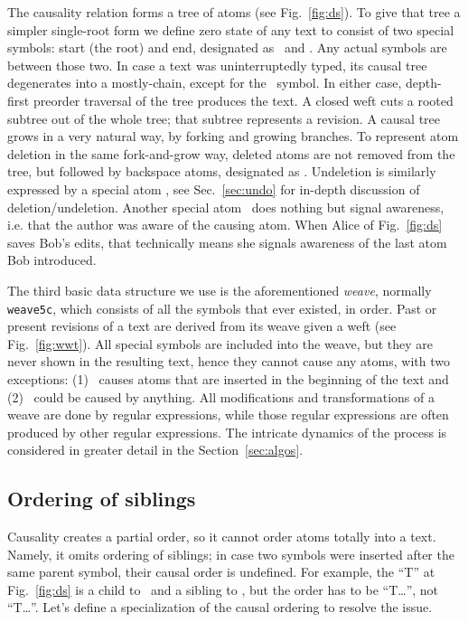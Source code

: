 \documentclass{sig-alternate}
\begin{document}
The causality relation forms a tree of atoms (see Fig.~\ref{fig:ds}).
To give that tree a simpler single-root form we define zero state of any text to consist of two special symbols: start (the root) and end, designated as \aum ~and \eoa.
Any actual symbols are between those two.
In case a text was uninterruptedly typed, its causal tree degenerates into a mostly-chain, except for the \eoa ~symbol.
In either case, depth-first preorder traversal of the tree produces the text.
A closed weft cuts a rooted subtree out of the whole tree; that subtree represents a revision.
A causal tree grows in a very natural way, by forking and growing branches.
To represent atom deletion in the same fork-and-grow way, deleted atoms are not removed from the tree, but followed by backspace atoms, designated as \bsp. 
Undeletion is similarly expressed by a special atom \cnc, see Sec.~\ref{sec:undo} for in-depth discussion of deletion/undeletion.
Another special atom \zero ~does nothing but signal awareness, i.e. that the author was aware of the causing atom. When Alice of Fig.~\ref{fig:ds} saves Bob's edits, that technically means she signals awareness of the last atom Bob introduced.

The third basic data structure we use is the aforementioned \emph{weave}, normally {\tt weave5c}, which consists of all the symbols that ever existed, in order. 
Past or present revisions of a text are derived from its weave given a weft (see Fig.~\ref{fig:wwt}).
All special symbols are included into the weave, but they are never shown in the resulting text, hence they cannot cause any atoms, with two exceptions: (1) \aum ~causes atoms that are inserted in the beginning of the text and (2) \zero ~could be caused by anything.
All modifications and transformations of a weave are done by regular expressions, while those regular expressions are often produced by other regular expressions.
The intricate dynamics of the process is considered in greater detail in the Section~\ref{sec:algos}.


\subsection {Ordering of siblings}  \label{sec:siblord}

Causality creates a partial order, so it cannot order atoms totally into a text.
Namely, it omits ordering of siblings; in case two symbols were inserted after the same parent symbol, their causal order is undefined.
For example, the ``T'' at Fig.~\ref{fig:ds} is a child to \aum ~and a sibling to \eoa, but the order has to be ``\aum T\ldots\eoa'', not ``\aum \eoa T\ldots''.
Let's define a specialization of the causal ordering to resolve the issue.
\end{document}
